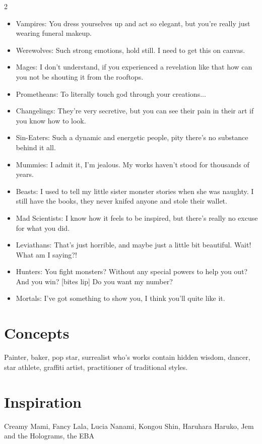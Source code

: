 \begin{multicols}{2}
\begin{itemize}
\item Vampires: You dress yourselves up and act so elegant, but you're really just wearing funeral makeup.
\item Werewolves: Such strong emotions, hold still. I need to get this on canvas. 
\item Mages: I don't understand, if you experienced a revelation like that how can you not be shouting it from the rooftops. 
\item Prometheans: To literally touch god through your creations...
\item Changelings: They're very secretive, but you can see their pain in their art if you know how to look.
\item Sin-Eaters: Such a dynamic and energetic people, pity there's no substance behind it all.
\item Mummies: I admit it, I'm jealous. My works haven't stood for thousands of years. 
\item Beasts:  I used to tell my little sister monster stories when she was naughty. I still have the books, they never knifed anyone and stole their wallet.


\item Mad Scientists: I know how it feels to be inspired, but there's really no excuse for what you did.
\item Leviathans: That's just horrible, and maybe just a little bit beautiful. Wait! What am I saying?!

\item Hunters: You fight monsters? Without any special powers to help you out? And you win? [bites lip] Do you want my number?
\item Mortals: I've got something to show you, I think you'll quite like it. 
\end{itemize}

\section*{Concepts}
Painter, baker, pop star, surrealist who's works contain hidden wisdom, dancer, star athlete, graffiti artist, practitioner of traditional styles. 

\section*{Inspiration}

Creamy Mami, Fancy Lala, Lucia Nanami, Kongou Shin, Haruhara Haruko, Jem and the Holograms, the EBA 



\end{multicols}\newpage{}
